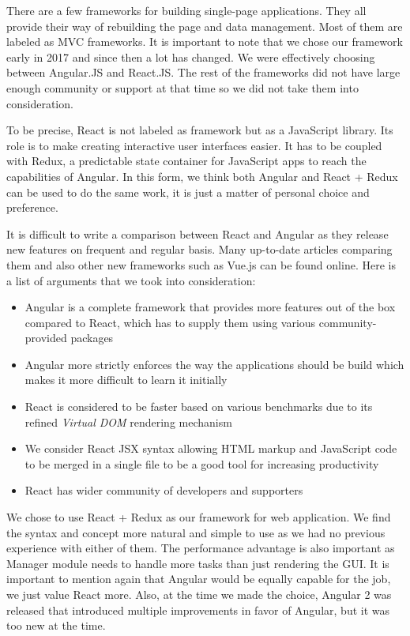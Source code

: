 There are a few frameworks for building single-page applications. They all provide their way of rebuilding the page and data management. Most of them are labeled as MVC frameworks. It is important to note that we chose our framework early in 2017 and since then a lot has changed. We were effectively choosing between Angular.JS and React.JS. The rest of the frameworks did not have large enough community or support at that time so we did not take them into consideration.
\par
To be precise, React is not labeled as framework but as a JavaScript library. Its role is to make creating interactive user interfaces easier. It has to be coupled with Redux, a predictable state container for JavaScript apps to reach the capabilities of Angular. In this form, we think both Angular and React + Redux can be used to do the same work, it is just a matter of personal choice and preference.
\par
It is difficult to write a comparison between React and Angular as they release new features on frequent and regular basis. Many up-to-date articles comparing them and also other new frameworks such as Vue.js can be found online. Here is a list of arguments that we took into consideration:
\begin{itemize}
    \item Angular is a complete framework that provides more features out of the box compared to React, which has to supply them using various community-provided packages
    \item Angular more strictly enforces the way the applications should be build which makes it more difficult to learn it initially
    \item React is considered to be faster based on various benchmarks due to its refined \textit{Virtual DOM} rendering mechanism
    \item We consider React JSX syntax allowing HTML markup and JavaScript code to be merged in a single file to be a good tool for increasing productivity
    \item React has wider community of developers and supporters
\end{itemize}
\par
We chose to use React + Redux as our framework for web application. We find the syntax and concept more natural and simple to use as we had no previous experience with either of them. The performance advantage is also important as Manager module needs to handle more tasks than just rendering the GUI. It is important to mention again that Angular would be equally capable for the job, we just value React more. Also, at the time we made the choice, Angular 2 was released that introduced multiple improvements in favor of Angular, but it was too new at the time.

